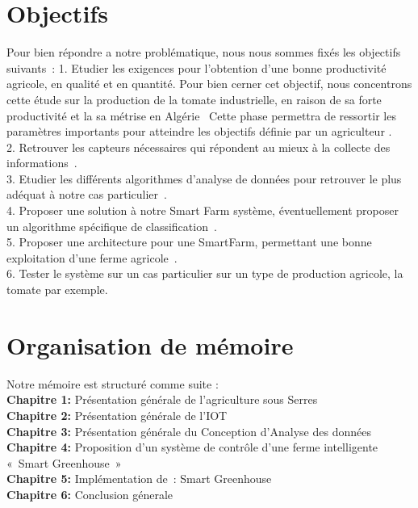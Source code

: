 \section*{Objectifs }
Pour bien répondre a notre problématique, nous nous sommes fixés les objectifs suivants : 
	1.	Etudier les exigences pour l’obtention d’une bonne productivité agricole, en qualité et en quantité. Pour bien cerner cet objectif, nous concentrons cette étude sur la production de la 
tomate industrielle, en raison de sa forte productivité et la sa métrise en Algérie  Cette phase permettra de ressortir les paramètres importants pour atteindre les objectifs définie par un agriculteur .
\\
	2.	Retrouver les capteurs nécessaires qui répondent au mieux à la collecte des informations .
\\
    3.	Etudier les différents algorithmes d’analyse de données pour retrouver le plus adéquat à notre cas particulier .
\\
    4.	Proposer une solution à notre Smart Farm système, éventuellement proposer un algorithme spécifique de classification .
\\
    5.	Proposer une architecture pour une SmartFarm, permettant une bonne exploitation d’une ferme agricole .
\\
    6.	Tester le système sur un cas particulier sur un type de production agricole, la tomate par exemple.  

\section*{Organisation de mémoire }
Notre mémoire est structuré comme suite : 
\\
\textbf{Chapitre 1: }
Présentation générale de l’agriculture sous Serres
\\
\textbf{Chapitre 2: }
Présentation générale de l’IOT
\\
\textbf{Chapitre 3: }
Présentation générale du Conception d’Analyse des données
\\
\textbf{Chapitre 4: }
Proposition d’un système de contrôle d’une ferme intelligente « Smart Greenhouse »  
\\
\textbf{Chapitre 5:}
Implémentation de : Smart Greenhouse
\\
\textbf{Chapitre 6:}
Conclusion génerale